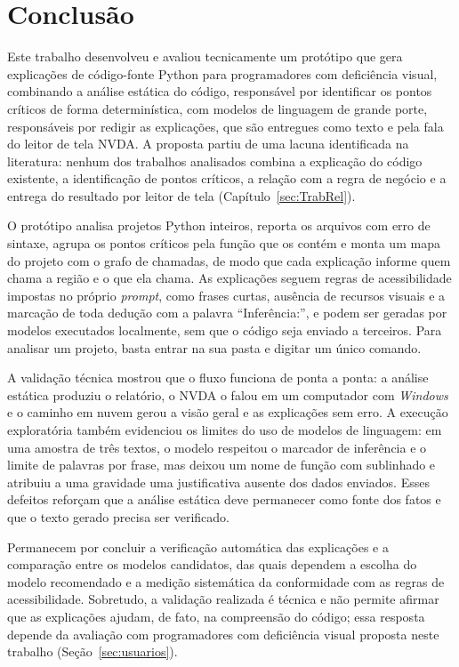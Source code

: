 \documentclass[
    12pt,                   %
    openright,              %
    oneside,                %
    a4paper,                %
    sumario=tradicional,    %
    english,                %
    brazil,                 %
    ]{abntex2}
\begin{document}
\chapter{Conclusão}\label{sec:conclusao}

Este trabalho desenvolveu e avaliou tecnicamente um protótipo que gera explicações de código-fonte Python para programadores com deficiência visual, combinando a análise estática do código, responsável por identificar os pontos críticos de forma determinística, com modelos de linguagem de grande porte, responsáveis por redigir as explicações, que são entregues como texto e pela fala do leitor de tela NVDA. A proposta partiu de uma lacuna identificada na literatura: nenhum dos trabalhos analisados combina a explicação do código existente, a identificação de pontos críticos, a relação com a regra de negócio e a entrega do resultado por leitor de tela (Capítulo~\ref{sec:TrabRel}).

O protótipo analisa projetos Python inteiros, reporta os arquivos com erro de sintaxe, agrupa os pontos críticos pela função que os contém e monta um mapa do projeto com o grafo de chamadas, de modo que cada explicação informe quem chama a região e o que ela chama. As explicações seguem regras de acessibilidade impostas no próprio \textit{prompt}, como frases curtas, ausência de recursos visuais e a marcação de toda dedução com a palavra \enquote{Inferência:}, e podem ser geradas por modelos executados localmente, sem que o código seja enviado a terceiros. Para analisar um projeto, basta entrar na sua pasta e digitar um único comando.

A validação técnica mostrou que o fluxo funciona de ponta a ponta: a análise estática produziu o relatório, o NVDA o falou em um computador com \textit{Windows} e o caminho em nuvem gerou a visão geral e as explicações sem erro. A execução exploratória também evidenciou os limites do uso de modelos de linguagem: em uma amostra de três textos, o modelo respeitou o marcador de inferência e o limite de palavras por frase, mas deixou um nome de função com sublinhado e atribuiu a uma gravidade uma justificativa ausente dos dados enviados. Esses defeitos reforçam que a análise estática deve permanecer como fonte dos fatos e que o texto gerado precisa ser verificado.

Permanecem por concluir a verificação automática das explicações e a comparação entre os modelos candidatos, das quais dependem a escolha do modelo recomendado e a medição sistemática da conformidade com as regras de acessibilidade. Sobretudo, a validação realizada é técnica e não permite afirmar que as explicações ajudam, de fato, na compreensão do código; essa resposta depende da avaliação com programadores com deficiência visual proposta neste trabalho (Seção~\ref{sec:usuarios}).
\end{document}
